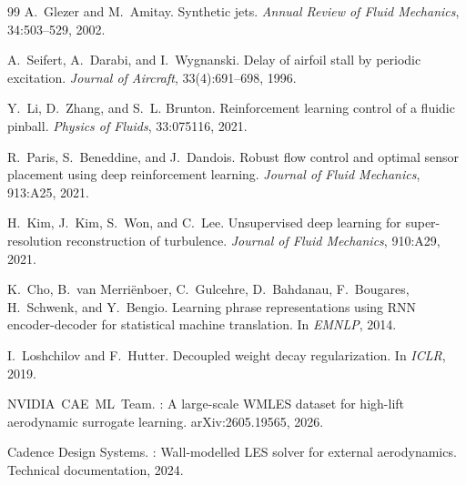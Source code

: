 \documentclass[10pt,twocolumn,letterpaper]{article}
\begin{document}
{\begin{thebibliography}{99}
A.~Glezer and M.~Amitay.
\newblock Synthetic jets.
\newblock \emph{Annual Review of Fluid Mechanics}, 34:503--529, 2002.

A.~Seifert, A.~Darabi, and I.~Wygnanski.
\newblock Delay of airfoil stall by periodic excitation.
\newblock \emph{Journal of Aircraft}, 33(4):691--698, 1996.

Y.~Li, D.~Zhang, and S.~L. Brunton.
\newblock Reinforcement learning control of a fluidic pinball.
\newblock \emph{Physics of Fluids}, 33:075116, 2021.

R.~Paris, S.~Beneddine, and J.~Dandois.
\newblock Robust flow control and optimal sensor placement using deep
  reinforcement learning.
\newblock \emph{Journal of Fluid Mechanics}, 913:A25, 2021.

H.~Kim, J.~Kim, S.~Won, and C.~Lee.
\newblock Unsupervised deep learning for super-resolution reconstruction of
  turbulence.
\newblock \emph{Journal of Fluid Mechanics}, 910:A29, 2021.

K.~Cho, B.~van Merri{\"e}nboer, C.~Gulcehre, D.~Bahdanau,
  F.~Bougares, H.~Schwenk, and Y.~Bengio.
\newblock Learning phrase representations using {RNN} encoder-decoder for
  statistical machine translation.
\newblock In \emph{EMNLP}, 2014.

I.~Loshchilov and F.~Hutter.
\newblock Decoupled weight decay regularization.
\newblock In \emph{ICLR}, 2019.

NVIDIA~CAE~ML~Team.
: A large-scale {WMLES} dataset for high-lift
  aerodynamic surrogate learning.
\newblock arXiv:2605.19565, 2026.

Cadence Design Systems.
: Wall-modelled {LES} solver for external
  aerodynamics.
\newblock Technical documentation, 2024.

\end{thebibliography}
}
\end{document}
